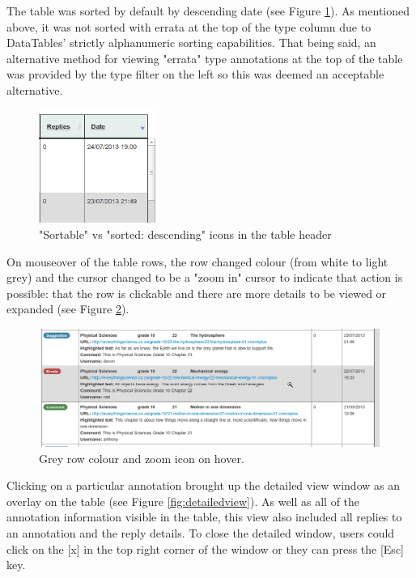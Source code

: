 The table was sorted by default by descending date (see Figure \ref{fig:sort}).  As mentioned above, it was not sorted with errata at the top of  the type column due to DataTables' strictly alphanumeric sorting capabilities. That being said, an alternative method for viewing "errata" type annotations at the top of the table was provided by the type filter on the left so this was deemed an acceptable alternative. 
\begin{figure}[h!]
    \centering
    \includegraphics[width=0.35\textwidth]{Figures/V1/sorticons.png}
 \caption{"Sortable" vs "sorted: descending" icons in the table header}
 \label{fig:sort}

\end{figure}	

On mouseover of the table rows, the row changed colour (from white to light grey) and the cursor changed to be a "zoom in" cursor to indicate that action is possible: that the row is clickable and there are more details to be viewed or expanded (see Figure \ref{fig:mouseover}).

\begin{figure}[h!]
    \centering
    \includegraphics[width=\textwidth]{Figures/V1/mouseover.png}
 \caption{Grey row colour and zoom icon on hover.}
 \label{fig:mouseover}

\end{figure}

Clicking on a particular annotation brought up the detailed view window as an overlay on the table (see Figure \ref{fig:detailedview}). As well as all of the annotation information visible in the table, this view also included all replies to an annotation and the reply details. To close the detailed window, users could click on the [x] in the top right corner of the window or they can press the [Esc] key. 

